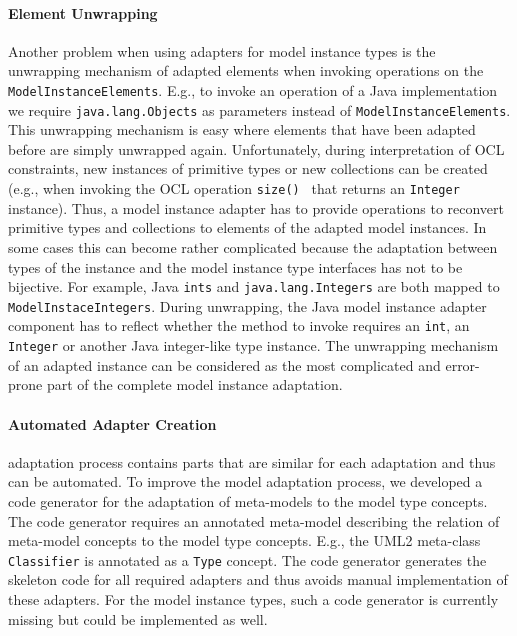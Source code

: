 	\paragraph{Element Unwrapping}
	Another problem when using adapters for model instance types 
	is the unwrapping mechanism of adapted elements when invoking operations 
	on the \texttt{ModelInstanceElements}. E.g., to invoke an operation of a Java 
	implementation we require \texttt{java.lang.Objects} as parameters instead of 
	\texttt{ModelInstanceElements}. This unwrapping mechanism is easy 
	where elements that have been adapted before are simply unwrapped 
	again. Unfortunately, during interpretation of OCL constraints, 
	new instances of primitive types or new collections can be created 
	(e.g., when invoking the OCL operation \texttt{size() } that 
	returns an \texttt{Integer} instance). Thus, a 
	model instance adapter has to provide operations to reconvert 
	primitive types and collections to elements of the adapted model 
	instances. In some cases this can become rather complicated because 
	the adaptation between types of the instance and the model 
	instance type interfaces has not to be bijective. For 
	example, Java \texttt{ints} and \texttt{java.lang.Integers} are 
	both mapped to \texttt{ModelInstaceIntegers}. During unwrapping, 
	the Java model instance adapter component has to reflect 
	whether the method to invoke requires an \texttt{int}, an 
	\texttt{Integer} or another Java integer-like type instance.
	The unwrapping mechanism of an adapted instance 
	can be considered as the most complicated and error-prone part 
	of the complete model instance adaptation.

	\paragraph{Automated Adapter Creation}
	 adaptation process  contains parts that are similar 
	for each adaptation and thus can be automated.
	To improve the model adaptation process, we developed a code generator 
	for the adaptation of meta-models to the model type concepts. The code 
	generator requires an annotated meta-model describing
	the relation of meta-model concepts to the model type concepts.
	E.g., the UML2 meta-class \texttt{Classifier} is annotated as a \texttt{Type} concept. 
	The code generator generates the skeleton code for all required 
	adapters and thus avoids manual implementation of these adapters. 
	For the model instance types, such a code generator is currently 
	missing but could be implemented as well.
	
